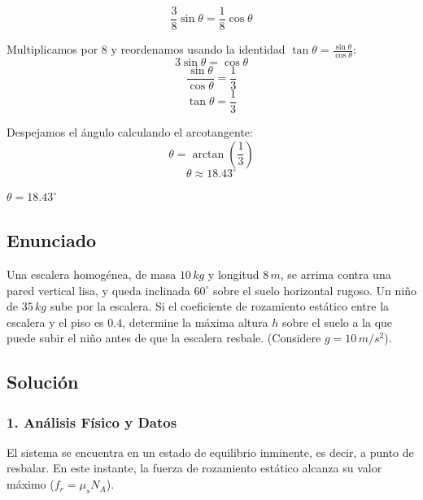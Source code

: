 \documentclass[12pt, a4paper]{article}
\begin{document}
$$\frac{3}{8} \sin\theta = \frac{1}{8} \cos\theta$$

Multiplicamos por 8 y reordenamos usando la identidad $\tan\theta = \frac{\sin\theta}{\cos\theta}$:
$$3 \sin\theta = \cos\theta$$
$$\frac{\sin\theta}{\cos\theta} = \frac{1}{3}$$
$$\tan\theta = \frac{1}{3}$$

Despejamos el ángulo calculando el arcotangente:
$$\theta = \arctan\left(\frac{1}{3}\right)$$
$$\theta \approx 18.43^\circ$$

\begin{tcolorbox}[colback=green!5!white, colframe=green!50!black, title=Respuesta Final]
\centering \Large $\theta = 18.43^\circ$
\end{tcolorbox}

\newpage

\subsection*{Enunciado}
Una escalera homogénea, de masa $10 \, \si{kg}$ y longitud $8 \, \si{m}$, se arrima contra una pared vertical lisa, y queda inclinada $60^\circ$ sobre el suelo horizontal rugoso. Un niño de $35 \, \si{kg}$ sube por la escalera. Si el coeficiente de rozamiento estático entre la escalera y el piso es $0.4$, determine la máxima altura $h$ sobre el suelo a la que puede subir el niño antes de que la escalera resbale. (Considere $g=10\,\si{m/s^2}$).

\begin{center}
\end{center}

\subsection*{Solución}

\subsubsection*{1. Análisis Físico y Datos}
El sistema se encuentra en un estado de equilibrio inminente, es decir, a punto de resbalar. En este instante, la fuerza de rozamiento estático alcanza su valor máximo ($f_r = \mu_s N_A$).
\end{document}
